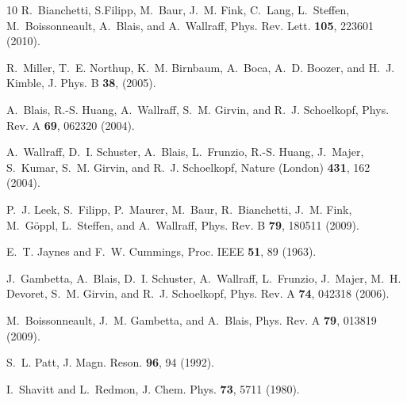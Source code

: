 \documentclass[pra,twocolumn,floatfix,superscriptaddress,eqsecnum]{revtex4-1}
\begin{document}
\begin{thebibliography}{10}
R.~Bianchetti, S.Filipp, M.~Baur, J.~M. Fink, C.~Lang, L.~Steffen,
  M.~Boissonneault, A.~Blais, and A.~Wallraff, Phys. Rev. Lett. \textbf{105}, 223601 (2010).

R.~Miller, T.~E. Northup, K.~M. Birnbaum, A.~Boca, A.~D. Boozer, and H.~J.
  Kimble, J. Phys. B \textbf{38},  (2005).

A.~Blais, R.-S. Huang, A.~Wallraff, S.~M. Girvin, and R.~J. Schoelkopf, Phys.
  Rev. A \textbf{69}, 062320 (2004).

A.~Wallraff, D.~I. Schuster, A.~Blais, L.~Frunzio, R.-S. Huang, J.~Majer,
  S.~Kumar, S.~M. Girvin, and R.~J. Schoelkopf, Nature (London) \textbf{431},
  162 (2004).

P.~J. Leek, S.~Filipp, P.~Maurer, M.~Baur, R.~Bianchetti, J.~M. Fink,
  M.~G{\"o}ppl, L.~Steffen, and A.~Wallraff, Phys. Rev. B \textbf{79}, 180511
  (2009).

E.~T. Jaynes and F.~W. Cummings, Proc. IEEE \textbf{51}, 89 (1963).

J.~Gambetta, A.~Blais, D.~I. Schuster, A.~Wallraff, L.~Frunzio, J.~Majer, M.~H.
  Devoret, S.~M. Girvin, and R.~J. Schoelkopf, Phys. Rev. A \textbf{74}, 042318
  (2006).

M.~Boissonneault, J.~M. Gambetta, and A.~Blais, Phys. Rev. A \textbf{79},
  013819 (2009).

S.~L. Patt, J. Magn. Reson. \textbf{96}, 94 (1992).

I.~Shavitt and L.~Redmon, J. Chem. Phys. \textbf{73}, 5711 (1980).

\end{thebibliography}
\end{document}
